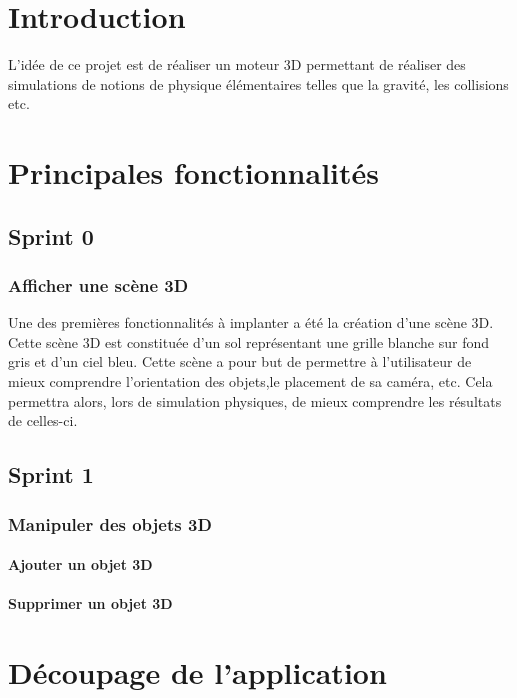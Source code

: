 \documentclass[11pt]{report}
\begin{document}


\tableofcontents


\chapter{Introduction}

L'idée de ce projet est de réaliser un moteur 3D permettant de réaliser des simulations de notions de 
physique élémentaires telles que la gravité, les collisions etc.

\chapter{Principales fonctionnalités}

\section{Sprint 0}

\subsection{Afficher une scène 3D}
Une des premières fonctionnalités à implanter a été la création d'une scène 3D. 
Cette scène 3D est constituée d'un sol représentant une grille blanche sur fond gris et d'un ciel bleu.
Cette scène a pour but de permettre à l'utilisateur de mieux comprendre l'orientation des objets,le placement
de sa caméra, etc. Cela permettra alors, lors de simulation physiques, de mieux comprendre les résultats de celles-ci.

\section{Sprint 1}
\subsection{Manipuler des objets 3D}
\subsubsection{Ajouter un objet 3D}

\subsubsection{Supprimer un objet 3D}

\chapter{Découpage de l'application}
\end{document}
